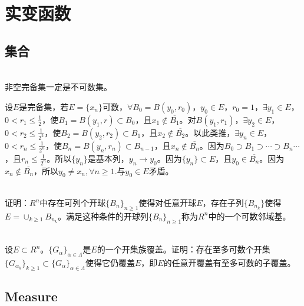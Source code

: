 \chapter{实变函数}







\section{集合}






\begin{example}
\hfill\\
非空完备集一定是不可数集。


设$E$是完备集，若$E=\{x_n\}$可数，$\forall B_0=B(y_0,r_0)$，$y_0\in E$，$r_0=1$，$\exists y_1\in E$，$0<r_1\leq\frac{1}{2}$，使$B_1=B(y_1,r)\subset B_0$，且$x_1\not\in\overline{B_1}$。对$B(y_1,r_1)$，$\exists y_2\in E$，$0<r_2\leq\frac{1}{2^2}$，使$B_2=B(y_2,r_2)\subset B_1$，且$x_2\not\in\overline{B_2}$。以此类推，$\exists y_n\in E$，$0<r_n\leq\frac{1}{2^n}$，使$B_n=B(y_n,r_n)\subset B_{n-1}$，且$x_n\not\in\overline{B_n}$。因为$B_0\supset B_1\supset\cdots\supset B_n\cdots$，且$r_n\leq\frac{1}{2^n}$。所以$\{y_n\}$是基本列，$y_n\to y_0$。因为$\{y_n\}\subset E$，且$y_0\in\overline{B_n}$。因为$x_n\not\in\overline{B_n}$，所以$y_0\neq x_n,\forall n\geq1.$与$y_0\in E$矛盾。
\end{example}




\begin{exercise}
\hfill\\
证明：$R^n$中存在可列个开球$\{B_n\}_{n\geq1}$使得对任意开球$E$，存在子列$\{B_{n_k}\}$使得$E=\cup_{k\geq1}B_{n_k}$。满足这种条件的开球列$\{B_n\}_{n\geq1}$称为$R^n$中的一个可数邻域基。



\end{exercise}



\begin{exercise}
\hfill\\
设$E\subset R^n$。$\{G_{\alpha}\}_{\alpha\in\Lambda}$是$E$的一个开集族覆盖。证明：存在至多可数个开集$\{G_{\alpha_k}\}_{k\geq1}\subset\{G_{\alpha}\}_{\alpha\in\Lambda}$使得它仍覆盖$E$，即$E$的任意开覆盖有至多可数的子覆盖。
\end{exercise}

\section{Measure}

